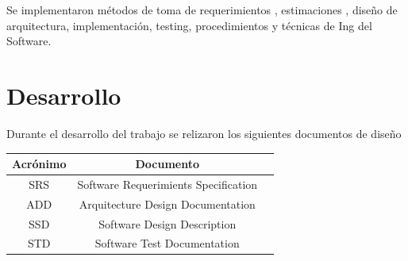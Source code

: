 \documentclass[a4paper,11pt]{book}
\begin{document}
Se implementaron métodos de toma de requerimientos , estimaciones ,
diseño de arquitectura, implementación, testing, procedimientos y técnicas
de Ing del Software.

\section{Desarrollo}
Durante el desarrollo del trabajo se relizaron los siguientes documentos de
diseño

\vspace{1cm}

\begin{table}[!h]
\begin{center}
\begin{tabular}{|c|c|c|}
\hline
\rowcolor[gray]{.8} Acrónimo & Documento \\

\hline
SRS & Software Requerimients Specification \\
\hline
ADD & Arquitecture Design Documentation \\
\hline
SSD & Software Design Description \\
\hline
STD & Software Test Documentation \\
\hline

\end{tabular}
\end{center}
\end{table}





\end{document}
